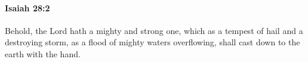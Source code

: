 
		\paragraph{Isaiah 28:2} %
			\label{ISAIAH-28-2}

			Behold, the Lord hath a mighty and strong one, which as a tempest of hail and a destroying storm, as a flood of mighty waters overflowing, shall cast down to the earth with the hand.


